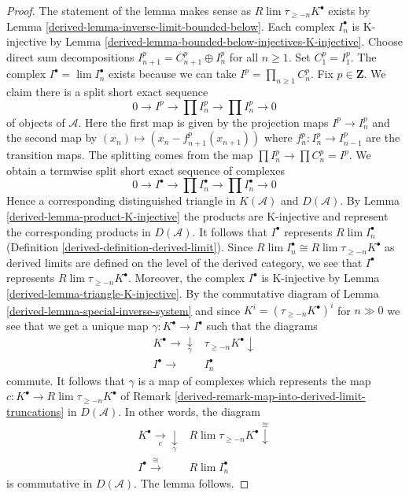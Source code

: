 \begin{proof}

The statement of the lemma makes sense as $R\lim \tau_{\geq -n}K^\bullet$
exists by Lemma \ref{derived-lemma-inverse-limit-bounded-below}.
Each complex $I_n^\bullet$ is K-injective by
Lemma \ref{derived-lemma-bounded-below-injectives-K-injective}.
Choose direct sum decompositions $I_{n + 1}^p = C_{n + 1}^p \oplus I_n^p$
for all $n \geq 1$. Set $C_1^p = I_1^p$. The complex
$I^\bullet = \lim I_n^\bullet$ exists because we can take
$I^p = \prod_{n \geq 1} C_n^p$. Fix $p \in \mathbf{Z}$.
We claim there is a split short exact sequence
$$
0 \to I^p \to \prod I_n^p \to \prod I_n^p \to 0
$$
of objects of $\mathcal{A}$. Here the first map is given by
the projection maps $I^p \to I_n^p$ and the second map
by $(x_n) \mapsto (x_n - f^p_{n + 1}(x_{n + 1}))$ where
$f^p_n : I_n^p \to I_{n - 1}^p$ are the transition maps.
The splitting comes from the map $\prod I_n^p \to \prod C_n^p = I^p$.
We obtain a termwise split short exact sequence of complexes
$$
0 \to I^\bullet \to \prod I_n^\bullet \to \prod I_n^\bullet \to 0
$$
Hence a corresponding distinguished triangle in $K(\mathcal{A})$
and $D(\mathcal{A})$. By Lemma \ref{derived-lemma-product-K-injective}
the products are K-injective and represent the corresponding
products in $D(\mathcal{A})$.
It follows that $I^\bullet$ represents $R\lim I_n^\bullet$
(Definition \ref{derived-definition-derived-limit}).
Since $R\lim I_n^\bullet \cong R\lim \tau_{\geq -n}K^\bullet$
as derived limits are defined on the level of the derived
category, we see that $I^\bullet$ represents $R\lim \tau_{\geq -n}K^\bullet$.
Moreover, the complex $I^\bullet$ is K-injective by
Lemma \ref{derived-lemma-triangle-K-injective}.
By the commutative diagram of Lemma \ref{derived-lemma-special-inverse-system}
and since $K^i = (\tau_{\geq -n}K^\bullet)^i$
for $n \gg 0$ we see that we get a unique map
$\gamma : K^\bullet \to I^\bullet$ such that the diagrams
$$
\begin{array}{cc}K^\bullet \longrightarrow\underset{\gamma}{\downarrow} & \tau_{\geq -n} K^\bullet \downarrow \\ I^\bullet \longrightarrow & I_n^\bullet\end{array}
$$
commute. It follows that $\gamma$ is a map of complexes which represents
the map $c : K^\bullet \to R\lim \tau_{\geq -n}K^\bullet$ of
Remark \ref{derived-remark-map-into-derived-limit-truncations}
in $D(\mathcal{A})$. In other words, the diagram
$$
\begin{array}{cc}K^\bullet \underset{c}{\longrightarrow}\underset{\gamma}{\downarrow} & R\lim \tau_{\geq -n} K^\bullet
\overset{\cong}{\downarrow} \\ I^\bullet \overset{\cong}{\longrightarrow} & R\lim I_n^\bullet\end{array}
$$
is commutative in $D(\mathcal{A})$. The lemma follows.
\end{proof}

